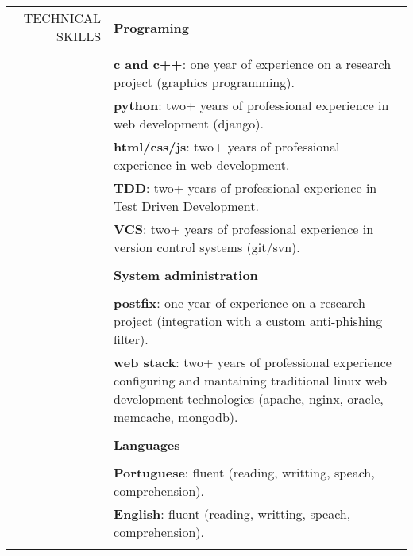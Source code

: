 \begin{tabular}{rp{13cm}}
    TECHNICAL SKILLS
    & \bf Programing \\\\
    & \textbf{c and c++}: one year of experience on a research project (graphics programming). \\
    & \textbf{python}: two+ years of professional experience in web development (django). \\
    & \textbf{html/css/js}: two+ years of professional experience in web development. \\
    & \textbf{TDD}: two+ years of professional experience in Test Driven Development. \\
    & \textbf{VCS}: two+ years of professional experience in version control systems (git/svn). \\\\
    & \bf System administration \\\\
    & \textbf{postfix}: one year of experience on a research project (integration with a custom anti-phishing filter). \\
    & \textbf{web stack}: two+ years of professional experience configuring and mantaining traditional linux web development technologies (apache, nginx, oracle, memcache, mongodb). \\\\
    & \bf Languages \\\\
    & \textbf{Portuguese}: fluent (reading, writting, speach, comprehension). \\
    & \textbf{English}: fluent (reading, writting, speach, comprehension). \\\\
    \hline
\end{tabular}
